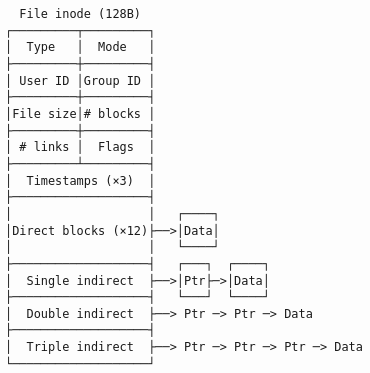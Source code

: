 \documentclass[varwidth,crop]{standalone}
\begin{document}
\begin{verbatim}
  File inode (128B)
┌─────────┬─────────┐
│  Type   │  Mode   │
├─────────┼─────────┤
│ User ID │Group ID │
├─────────┼─────────┤
│File size│# blocks │
├─────────┼─────────┤
│ # links │  Flags  │
├─────────┴─────────┤
│  Timestamps (×3)  │   
├───────────────────┤   
│                   │   ┌────┐
│Direct blocks (×12)├──>│Data│
│                   │   └────┘
├───────────────────┤   ┌───┐  ┌────┐
│  Single indirect  ├──>│Ptr├─>│Data│
├───────────────────┤   └───┘  └────┘
│  Double indirect  ├──> Ptr ─> Ptr ─> Data
├───────────────────┤ 
│  Triple indirect  ├──> Ptr ─> Ptr ─> Ptr ─> Data
└───────────────────┘ 
\end{verbatim}
\end{document}
